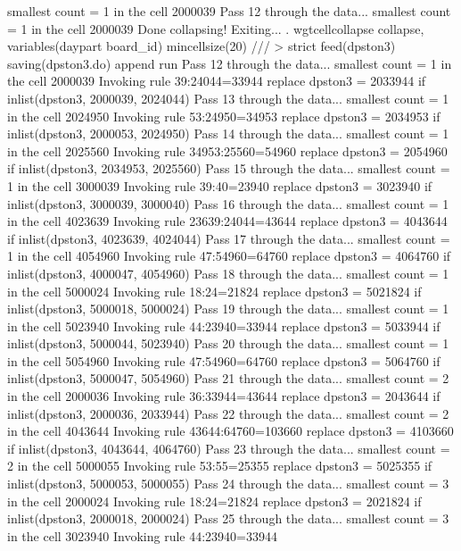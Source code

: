   smallest count = 1 in the cell      2000039
Pass 12 through the data...
  smallest count = 1 in the cell      2000039
  Done collapsing! Exiting...
{\smallskip}
. wgtcellcollapse collapse, variables(daypart board_id) mincellsize(20) ///
>         strict feed(dpston3) saving(dpston3.do) append run
Pass 12 through the data...
  smallest count = 1 in the cell      2000039
  Invoking rule 39:24044=33944
  replace dpston3 = 2033944 if inlist(dpston3, 2000039, 2024044)
Pass 13 through the data...
  smallest count = 1 in the cell      2024950
  Invoking rule 53:24950=34953
  replace dpston3 = 2034953 if inlist(dpston3, 2000053, 2024950)
Pass 14 through the data...
  smallest count = 1 in the cell      2025560
  Invoking rule 34953:25560=54960
  replace dpston3 = 2054960 if inlist(dpston3, 2034953, 2025560)
Pass 15 through the data...
  smallest count = 1 in the cell      3000039
  Invoking rule 39:40=23940
  replace dpston3 = 3023940 if inlist(dpston3, 3000039, 3000040)
Pass 16 through the data...
  smallest count = 1 in the cell      4023639
  Invoking rule 23639:24044=43644
  replace dpston3 = 4043644 if inlist(dpston3, 4023639, 4024044)
Pass 17 through the data...
  smallest count = 1 in the cell      4054960
  Invoking rule 47:54960=64760
  replace dpston3 = 4064760 if inlist(dpston3, 4000047, 4054960)
Pass 18 through the data...
  smallest count = 1 in the cell      5000024
  Invoking rule 18:24=21824
  replace dpston3 = 5021824 if inlist(dpston3, 5000018, 5000024)
Pass 19 through the data...
  smallest count = 1 in the cell      5023940
  Invoking rule 44:23940=33944
  replace dpston3 = 5033944 if inlist(dpston3, 5000044, 5023940)
Pass 20 through the data...
  smallest count = 1 in the cell      5054960
  Invoking rule 47:54960=64760
  replace dpston3 = 5064760 if inlist(dpston3, 5000047, 5054960)
Pass 21 through the data...
  smallest count = 2 in the cell      2000036
  Invoking rule 36:33944=43644
  replace dpston3 = 2043644 if inlist(dpston3, 2000036, 2033944)
Pass 22 through the data...
  smallest count = 2 in the cell      4043644
  Invoking rule 43644:64760=103660
  replace dpston3 = 4103660 if inlist(dpston3, 4043644, 4064760)
Pass 23 through the data...
  smallest count = 2 in the cell      5000055
  Invoking rule 53:55=25355
  replace dpston3 = 5025355 if inlist(dpston3, 5000053, 5000055)
Pass 24 through the data...
  smallest count = 3 in the cell      2000024
  Invoking rule 18:24=21824
  replace dpston3 = 2021824 if inlist(dpston3, 2000018, 2000024)
Pass 25 through the data...
  smallest count = 3 in the cell      3023940
  Invoking rule 44:23940=33944
